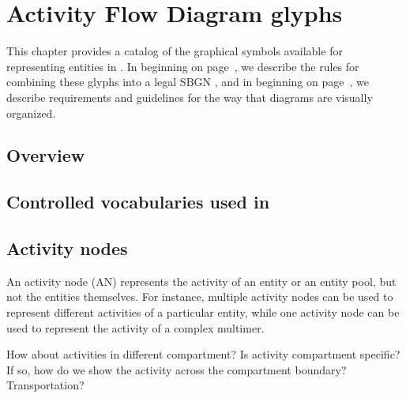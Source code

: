 \chapter{Activity Flow Diagram glyphs}


This chapter provides a catalog of the graphical symbols available for representing entities in \AFs. In  beginning on page~\pageref{chp:af:grammar}, we describe the rules for combining these glyphs into a legal SBGN \AF, and in  beginning on page~\pageref{chp:af:layout}, we describe requirements and guidelines for the way that diagrams are visually organized.

\section{Overview}



\section{Controlled vocabularies used in \SBGNAFLone}\label{af:sec:CVs}




\section{Activity nodes}\label{af:sec:ANs}

An activity node (AN) represents the activity of an entity or an entity pool, but not the entities themselves. For instance, multiple activity nodes can be used to represent different activities of a particular entity, while one activity node can be used to represent the activity of a complex multimer.

\color{red} How about activities in different compartment?  Is activity compartment specific?  If so, how do we show the activity across the compartment boundary?  Transportation? \normalcolor


